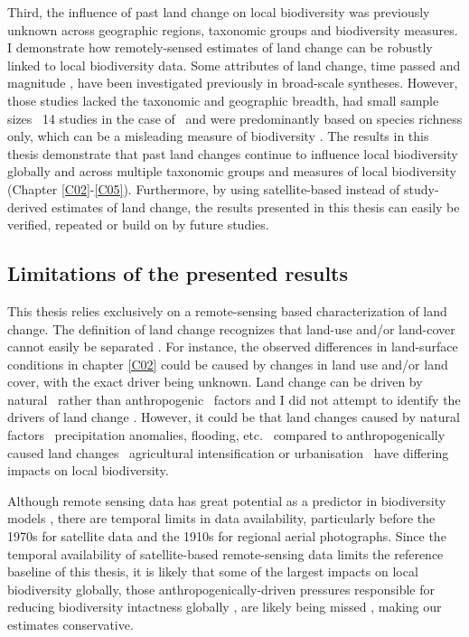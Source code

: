 Third, the influence of past land change on local biodiversity was previously unknown across geographic regions, taxonomic groups and biodiversity measures. I demonstrate how remotely-sensed estimates of land change can be robustly linked to local biodiversity data. Some attributes of land change, \eg time passed \citep{Martin2013,Fu2017} and magnitude \citep{Shackelford2017}, have been investigated previously in broad-scale syntheses. However, those studies lacked the taxonomic and geographic breadth, had small sample sizes \textendash\ 14 studies in the case of \cite{Shackelford2017} \textendash\ and were predominantly based on species richness only, which can be a misleading measure of biodiversity \citep{Su2004,Hillebrand2017}. The results in this thesis demonstrate that past land changes continue to influence local biodiversity globally and across multiple taxonomic groups and measures of local biodiversity (Chapter \ref{C02}-\ref{C05}). Furthermore, by using satellite-based instead of study-derived estimates of land change, the results presented in this thesis can easily be verified, repeated or build on by future studies. 

\subsection{Limitations of the presented results}
\label{C06_0102}

This thesis relies exclusively on a remote-sensing based characterization of land change. The definition of land change recognizes that land-use and/or land-cover cannot easily be separated \citep{Turner2007}. For instance, the observed differences in land-surface conditions in chapter \ref{C02} could be caused by changes in land use and/or land cover, with the exact driver being unknown. Land change can be driven by natural \textendash\ rather than anthropogenic \textendash\ factors and I did not attempt to identify the drivers of land change \citep{Curtis2018}. However, it could be that land changes caused by natural factors \textendash\ \eg precipitation anomalies, flooding, etc. \textendash\ compared to anthropogenically caused land changes \textendash\ \eg agricultural intensification or urbanisation \textendash\ have differing impacts on local biodiversity.

Although remote sensing data has great potential as a predictor in biodiversity models \citep{Petrou2015,Lausch2016}, there are temporal limits in data availability, particularly before the 1970s for satellite data and the 1910s for regional aerial photographs. Since the temporal availability of satellite-based remote-sensing data limits the reference baseline of this thesis, it is likely that some of the largest impacts on local biodiversity globally, \eg those anthropogenically-driven pressures responsible for reducing biodiversity intactness globally \citep{Newbold2016a}, are likely being missed \citep{Mihoub2017}, making our estimates conservative.

